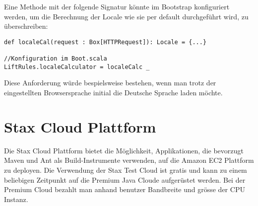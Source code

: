 Eine Methode mit der folgende Signatur k\"onnte im Bootstrap konfiguriert werden, um die Berechnung der Locale wie sie per default durchgef\"uhrt wird, zu \"uberschreiben:

\begin{lstlisting}[caption=\"Uberschreibung der Locale-Berechnung]
def localeCal(request : Box[HTTPRequest]): Locale = {...}

//Konfiguration im Boot.scala
LiftRules.localeCalculator = localeCalc _
\end{lstlisting}


Diese Anforderung w\"urde bespielsweise bestehen, wenn man trotz der eingestellten Browsersprache initial die Deutsche Sprache laden m\"ochte.

\section{Stax Cloud Plattform}
Die Stax Cloud Plattform\cite{Stax} bietet die M\"oglichkeit, Applikationen, die bevorzugt Maven und Ant als Build-Instrumente verwenden, auf die Amazon EC2 Plattform zu deployen. Die Verwendung der Stax Test Cloud ist gratis und kann zu einem beliebigen Zeitpunkt auf die Premium Java Cloude aufger\"ustet werden. Bei der Premium Cloud bezahlt man anhand benutzer Bandbreite und gr\"osse der CPU Instanz.






